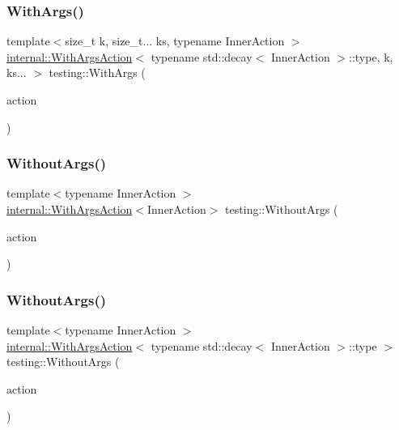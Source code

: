 \subsubsection{\texorpdfstring{WithArgs()}{WithArgs()}\hspace{0.1cm}{\footnotesize\ttfamily [11/11]}}
{\footnotesize\ttfamily template$<$size\+\_\+t k, size\+\_\+t... ks, typename Inner\+Action $>$ \\
\mbox{\hyperlink{structtesting_1_1internal_1_1_with_args_action}{internal\+::\+With\+Args\+Action}}$<$ typename std\+::decay$<$ Inner\+Action $>$\+::type, k, ks... $>$ testing\+::\+With\+Args (\begin{DoxyParamCaption}\item[{Inner\+Action \&\&}]{action }\end{DoxyParamCaption})}

\mbox{\label{namespacetesting_aeac85f74bd11112f69142e92e3a50780}} 
\subsubsection{\texorpdfstring{WithoutArgs()}{WithoutArgs()}\hspace{0.1cm}{\footnotesize\ttfamily [1/2]}}
{\footnotesize\ttfamily template$<$typename Inner\+Action $>$ \\
\mbox{\hyperlink{structtesting_1_1internal_1_1_with_args_action}{internal\+::\+With\+Args\+Action}}$<$Inner\+Action$>$ testing\+::\+Without\+Args (\begin{DoxyParamCaption}\item[{const Inner\+Action \&}]{action }\end{DoxyParamCaption})\hspace{0.3cm}{\ttfamily [inline]}}

\mbox{\label{namespacetesting_a0e5b756e6cf3ebf3abfdc1c913eb6376}} 
\subsubsection{\texorpdfstring{WithoutArgs()}{WithoutArgs()}\hspace{0.1cm}{\footnotesize\ttfamily [2/2]}}
{\footnotesize\ttfamily template$<$typename Inner\+Action $>$ \\
\mbox{\hyperlink{structtesting_1_1internal_1_1_with_args_action}{internal\+::\+With\+Args\+Action}}$<$ typename std\+::decay$<$ Inner\+Action $>$\+::type $>$ testing\+::\+Without\+Args (\begin{DoxyParamCaption}\item[{Inner\+Action \&\&}]{action }\end{DoxyParamCaption})}



